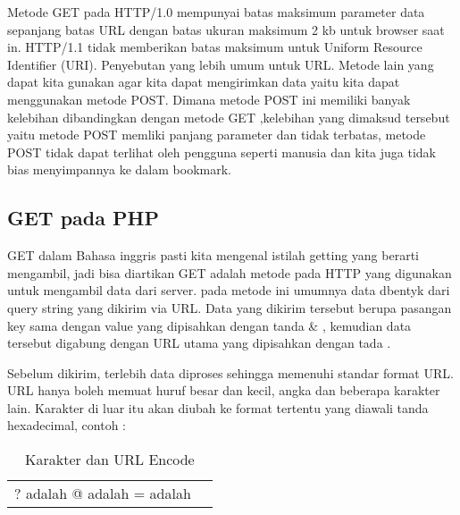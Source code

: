 Metode GET pada HTTP/1.0 mempunyai batas maksimum parameter data sepanjang batas URL dengan batas ukuran maksimum 2 kb untuk browser 
saat in. HTTP/1.1 tidak memberikan batas maksimum untuk Uniform Resource Identifier (URI). Penyebutan yang lebih umum untuk URL. Metode 
lain yang dapat kita gunakan agar kita dapat  mengirimkan data yaitu kita dapat menggunakan  metode POST. Dimana metode  POST ini 
memiliki banyak kelebihan dibandingkan dengan  metode GET ,kelebihan yang dimaksud tersebut yaitu metode POST  memliki panjang 
parameter dan tidak  terbatas,  metode POST tidak dapat terlihat oleh pengguna  seperti manusia dan  kita juga tidak bias menyimpannya 
ke dalam bookmark.

\subsection{GET pada PHP}
GET dalam Bahasa inggris pasti kita mengenal istilah getting yang berarti mengambil, jadi bisa diartikan GET adalah metode pada HTTP 
yang digunakan untuk mengambil data dari server. pada metode ini umumnya data dbentyk dari query string yang dikirim via URL. Data yang 
dikirim tersebut berupa pasangan key sama dengan value yang dipisahkan dengan tanda \& , kemudian data tersebut digabung dengan URL 
utama yang dipisahkan dengan tada \? . 

Sebelum dikirim, terlebih data diproses sehingga memenuhi standar format URL. URL hanya boleh memuat huruf besar dan kecil, angka dan 
beberapa karakter lain. Karakter di luar itu akan diubah ke format tertentu yang diawali tanda %
hexadecimal, contoh :

\begin{table} [ht]
\caption{Karakter dan URL Encode}
\centering
\begin {tabular} {|cc|}
\hline
? adalah %
\hline
@ adalah %
\hline
= adalah %
\hline
\end{tabular}
\label{ltabel}
\end{table}
 
